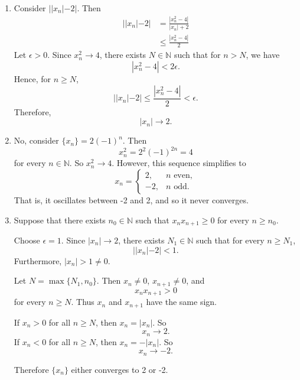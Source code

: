 \documentclass[12pt]{article}
\begin{document}
\begin{enumerate}
    \item [(a)] Consider $||x_n| - 2|$. Then
          \begin{align*}
              ||x_n| - 2| & = \frac{|x_n^2 - 4|}{|x_n| + 2} \\
                          & \leq \frac{|x_n^2 - 4|}{ 2}
          \end{align*}
          Let $\epsilon > 0$.
          Since $x_n^2 \to 4$, there exists $N \in \mathbb{N}$ such that for $n > N$, we have
          \[
              |x_n^2 - 4| < 2\epsilon.
          \]
          Hence, for $n \geq N$,
          \[
              ||x_n| - 2| \leq \frac{|x_n^2 - 4|}{ 2} < \epsilon.
          \]
          Therefore,
          \[
              |x_n| \to 2.
          \]
    \item [(b)]
          No, consider $\{x_n\} = 2(-1)^n$.
          Then
          \[
              x_n^2 = 2^2(-1)^{2n} = 4
          \]
          for every $n \in \mathbb{N}$.
          So $x_n^2 \to 4$.
          However, this sequence simplifies to
          \[
              x_n=
              \begin{cases}
                  2,  & n \text{ even}, \\
                  -2, & n \text{ odd}.
              \end{cases}
          \]
          That is, it oscillates between -2 and 2, and so it never converges.
    \item [(c)]
          Suppose that there exists $n_0 \in \mathbb{N}$ such
          that $x_n x_{n+1} \geq 0$ for every $n \geq n_0$.

          Choose $\epsilon = 1$. Since $|x_n| \to 2$, there exists $N_1 \in \mathbb{N}$
          such that for every $n \geq N_1$,
          \[
              ||x_n|-2| < 1.
          \]
          Furthermore, $|x_n| > 1 \neq 0$.

          Let $N = \max\{N_1, n_0\}$.
          Then $x_n \neq 0$, $x_{n+1} \neq 0$, and
          \[
              x_n x_{n+1} > 0
          \]
          for every $n \geq N$.
          Thus $x_n$ and $x_{n+1}$ have the same sign.

          If $x_n > 0$ for all $n \geq N$, then $x_n = |x_n|$. So
          \[
              x_n \to 2.
          \]
          If $x_n < 0$ for all $n \geq N$, then $x_n = -|x_n|$. So
          \[
              x_n \to -2.
          \]

          Therefore $\{x_n\}$ either converges to 2 or -2.
\end{enumerate}
\end{document}
